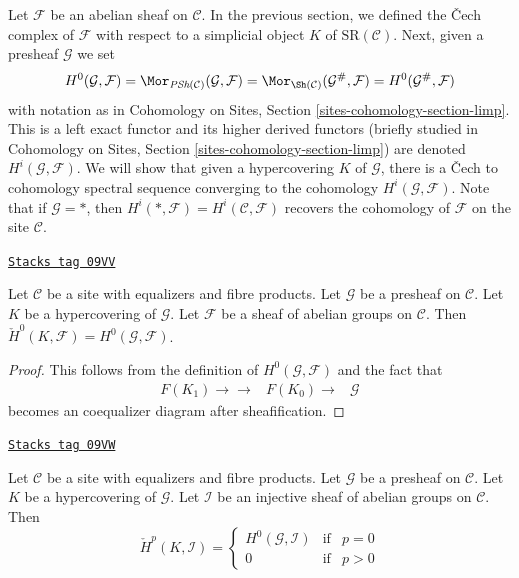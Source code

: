 \medskip\noindent
Let $\mathcal{F}$ be an abelian sheaf on $\mathcal{C}$.
In the previous section, we defined the {\v C}ech complex of $\mathcal{F}$
with respect to a simplicial object $K$ of $\text{SR}(\mathcal{C})$.
Next, given a presheaf $\mathcal{G}$ we set
$$
H^0(\mathcal{G}, \mathcal{F}) =
\Mor_{\textit{PSh}(\mathcal{C})}(\mathcal{G}, \mathcal{F}) =
\Mor_{\Sh(\mathcal{C})}(\mathcal{G}^\#, \mathcal{F}) =
H^0(\mathcal{G}^\#, \mathcal{F})
$$
with notation as in
Cohomology on Sites, Section \ref{sites-cohomology-section-limp}.
This is a left exact functor and its higher derived functors
(briefly studied in
Cohomology on Sites, Section \ref{sites-cohomology-section-limp})
are denoted $H^i(\mathcal{G}, \mathcal{F})$.
We will show that given a hypercovering $K$ of $\mathcal{G}$,
there is a {\v C}ech to cohomology spectral sequence converging to the
cohomology $H^i(\mathcal{G}, \mathcal{F})$.
Note that if $\mathcal{G} = *$, then
$H^i(*, \mathcal{F}) = H^i(\mathcal{C}, \mathcal{F})$ recovers
the cohomology of $\mathcal{F}$ on the site $\mathcal{C}$.

\begin{lemma}
\label{hypercovering-lemma-h0-cech-variant}
\href{https://stacks.math.columbia.edu/tag/09VV}{\texttt{Stacks tag 09VV}}

Let $\mathcal{C}$ be a site with equalizers and fibre products.
Let $\mathcal{G}$ be a presheaf on $\mathcal{C}$.
Let $K$ be a hypercovering of $\mathcal{G}$.
Let $\mathcal{F}$ be a sheaf of abelian groups on $\mathcal{C}$.
Then $\check{H}^0(K, \mathcal{F}) = H^0(\mathcal{G}, \mathcal{F})$.
\end{lemma}

\begin{proof}
This follows from the definition of $H^0(\mathcal{G}, \mathcal{F})$
and the fact that
$$
\begin{array}{ccc}F(K_1) \longrightarrow\longrightarrow & F(K_0) \longrightarrow & \mathcal{G}\end{array}
$$
becomes an coequalizer diagram after sheafification.
\end{proof}

\begin{lemma}
\label{hypercovering-lemma-injective-trivial-cech-variant}
\href{https://stacks.math.columbia.edu/tag/09VW}{\texttt{Stacks tag 09VW}}

Let $\mathcal{C}$ be a site with equalizers and fibre products.
Let $\mathcal{G}$ be a presheaf on $\mathcal{C}$.
Let $K$ be a hypercovering of $\mathcal{G}$.
Let $\mathcal{I}$ be an injective sheaf of abelian groups on $\mathcal{C}$.
Then
$$
\check{H}^p(K, \mathcal{I}) =
\left\{
\begin{matrix}
H^0(\mathcal{G}, \mathcal{I}) & \text{if} & p = 0 \\
0 & \text{if} & p > 0
\end{matrix}
\right.
$$
\end{lemma}

